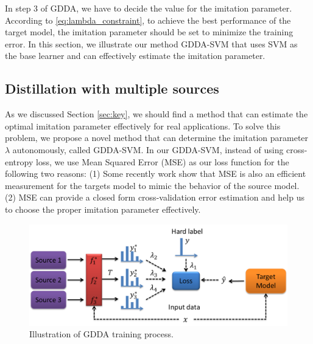 In step 3 of GDDA, we have to decide the value for the imitation parameter. According to \eqref{eq:lambda_constraint}, to achieve the best performance of the target model, the imitation parameter should be set to minimize the training error. In this section, we illustrate our method GDDA-SVM that uses SVM as the base learner and can effectively estimate the imitation parameter.
\subsection{Distillation with multiple sources}
As we discussed Section \ref{sec:key}, we should find a method that can estimate the optimal imitation parameter effectively for real applications. 
To solve this problem, we propose a novel method that can determine the imitation parameter $\lambda$ autonomously, called GDDA-SVM. In our GDDA-SVM, instead of using cross-entropy loss, we use Mean Squared Error (MSE) as our loss function for the following two reasons: (1) Some recently work \cite{ba2014deep,luo2016face,romero2014fitnets,urban2016deep} show that MSE is also an efficient measurement for the targets model to mimic the behavior of the source model. (2) MSE can provide a closed form cross-validation error estimation and help us to choose the proper imitation parameter effectively. 

\begin{figure}
\centering
\includegraphics[scale=.4]{figure/multi-GDDA.png}
\caption{Illustration of GDDA training process.}
\end{figure}

